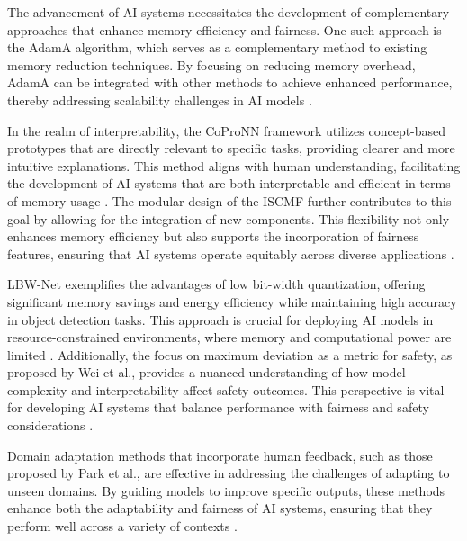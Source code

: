 The advancement of AI systems necessitates the development of complementary approaches that enhance memory efficiency and fairness. One such approach is the AdamA algorithm, which serves as a complementary method to existing memory reduction techniques. By focusing on reducing memory overhead, AdamA can be integrated with other methods to achieve enhanced performance, thereby addressing scalability challenges in AI models \cite{zhang2023adamaccumulationreducememory}.



In the realm of interpretability, the CoProNN framework utilizes concept-based prototypes that are directly relevant to specific tasks, providing clearer and more intuitive explanations. This method aligns with human understanding, facilitating the development of AI systems that are both interpretable and efficient in terms of memory usage \cite{chiaburu2024copronnconceptbasedprototypicalnearest}. The modular design of the ISCMF further contributes to this goal by allowing for the integration of new components. This flexibility not only enhances memory efficiency but also supports the incorporation of fairness features, ensuring that AI systems operate equitably across diverse applications \cite{lin2023interpretabilityframeworksimilarcase}.



LBW-Net exemplifies the advantages of low bit-width quantization, offering significant memory savings and energy efficiency while maintaining high accuracy in object detection tasks. This approach is crucial for deploying AI models in resource-constrained environments, where memory and computational power are limited \cite{yin2017quantizationtraininglowbitwidth}. Additionally, the focus on maximum deviation as a metric for safety, as proposed by Wei et al., provides a nuanced understanding of how model complexity and interpretability affect safety outcomes. This perspective is vital for developing AI systems that balance performance with fairness and safety considerations \cite{wei2022safetyinterpretablemachinelearning}.



Domain adaptation methods that incorporate human feedback, such as those proposed by Park et al., are effective in addressing the challenges of adapting to unseen domains. By guiding models to improve specific outputs, these methods enhance both the adaptability and fairness of AI systems, ensuring that they perform well across a variety of contexts \cite{park2023domainadaptationbasedhuman}.



